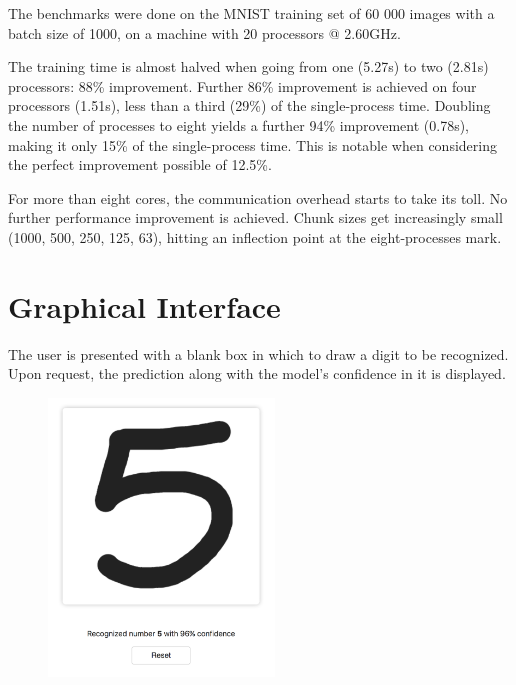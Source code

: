 \documentclass[a4paper]{article}
\begin{document}
\begin{center}
\end{center}

\noindent The benchmarks were done on the MNIST training set of 60 000 images with a batch size of 1000, on a machine with 20 processors @ 2.60GHz.

The training time is almost halved when going from one (5.27s) to two (2.81s) processors: 88\% improvement. Further 86\% improvement is achieved on four processors (1.51s), less than a third (29\%) of the single-process time. Doubling the number of processes to eight yields a further 94\% improvement (0.78s), making it only 15\% of the single-process time. This is notable when considering the perfect improvement possible of 12.5\%. 

For more than eight cores, the communication overhead starts to take its toll. No further performance improvement is achieved. Chunk sizes get increasingly small (1000, 500, 250, 125, 63), hitting an inflection point at the eight-processes mark.


\newpage
\section{Graphical Interface}


The user is presented with a blank box in which to draw a digit to be recognized. Upon request, the prediction along with the model's confidence in it is displayed. 

\begin{figure}\centering
    \includegraphics[width=6cm]{images/gui.png}
\end{figure}
\end{document}
